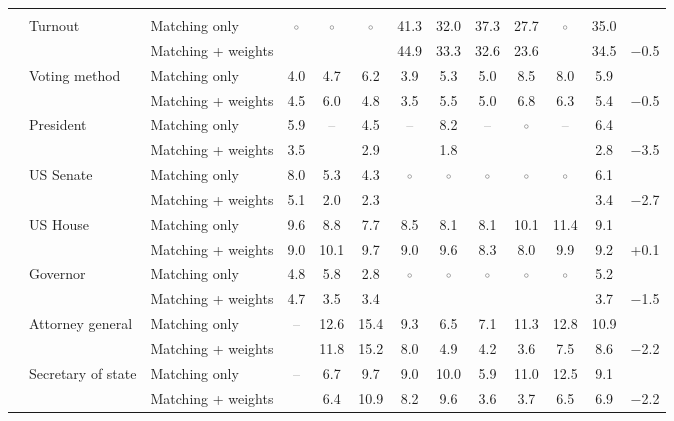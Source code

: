 \begin{table}[!htbp]
{\begin{threeparttable}
\begin{tabular}{llcccccccccc}
\addlinespace[0.3em]
\multicolumn{12}{l}{Non-demographic} \\
\addlinespace[0.1em]
~~Turnout & Matching only & \textcolor{gray}{$\circ$} & \textcolor{gray}{$\circ$} & \textcolor{gray}{$\circ$} & 41.3 & 32.0 & 37.3 & 27.7 & \textcolor{gray}{$\circ$} & 35.0 & \\
 & Matching + weights &  &  &  & 44.9 & 33.3 & 32.6 & 23.6 &  & 34.5 & $-$0.5 \\
\addlinespace[0.1em]
~~Voting method & Matching only & 4.0 & 4.7 & 6.2 & 3.9 & 5.3 & 5.0 & 8.5 & 8.0 & 5.9 & \\
 & Matching + weights & 4.5 & 6.0 & 4.8 & 3.5 & 5.5 & 5.0 & 6.8 & 6.3 & 5.4 & $-$0.5 \\
\addlinespace[0.1em]
~~President & Matching only & 5.9 & \textcolor{gray}{--} & 4.5 & \textcolor{gray}{--} & 8.2 & \textcolor{gray}{--} & \textcolor{gray}{$\circ$} & \textcolor{gray}{--} & 6.4 & \\
 & Matching + weights & 3.5 &  & 2.9 &  & 1.8 &  &  &  & 2.8 & $-$3.5 \\
\addlinespace[0.1em]
~~US Senate & Matching only & 8.0 & 5.3 & 4.3 & \textcolor{gray}{$\circ$} & \textcolor{gray}{$\circ$} & \textcolor{gray}{$\circ$} & \textcolor{gray}{$\circ$} & \textcolor{gray}{$\circ$} & 6.1 & \\
 & Matching + weights & 5.1 & 2.0 & 2.3 &  &  &  &  &  & 3.4 & $-$2.7 \\
\addlinespace[0.1em]
~~US House & Matching only & 9.6 & 8.8 & 7.7 & 8.5 & 8.1 & 8.1 & 10.1 & 11.4 & 9.1 & \\
 & Matching + weights & 9.0 & 10.1 & 9.7 & 9.0 & 9.6 & 8.3 & 8.0 & 9.9 & 9.2 & +0.1 \\
\addlinespace[0.1em]
~~Governor & Matching only & 4.8 & 5.8 & 2.8 & \textcolor{gray}{$\circ$} & \textcolor{gray}{$\circ$} & \textcolor{gray}{$\circ$} & \textcolor{gray}{$\circ$} & \textcolor{gray}{$\circ$} & 5.2 & \\
 & Matching + weights & 4.7 & 3.5 & 3.4 &  &  &  &  &  & 3.7 & $-$1.5 \\
\addlinespace[0.1em]
~~Attorney general & Matching only & \textcolor{gray}{--} & 12.6 & 15.4 & 9.3 & 6.5 & 7.1 & 11.3 & 12.8 & 10.9 & \\
 & Matching + weights &  & 11.8 & 15.2 & 8.0 & 4.9 & 4.2 & 3.6 & 7.5 & 8.6 & $-$2.2 \\
\addlinespace[0.1em]
~~Secretary of state & Matching only & \textcolor{gray}{--} & 6.7 & 9.7 & 9.0 & 10.0 & 5.9 & 11.0 & 12.5 & 9.1 & \\
 & Matching + weights &  & 6.4 & 10.9 & 8.2 & 9.6 & 3.6 & 3.7 & 6.5 & 6.9 & $-$2.2 \\

\end{tabular}
\end{threeparttable}}
\end{table}
